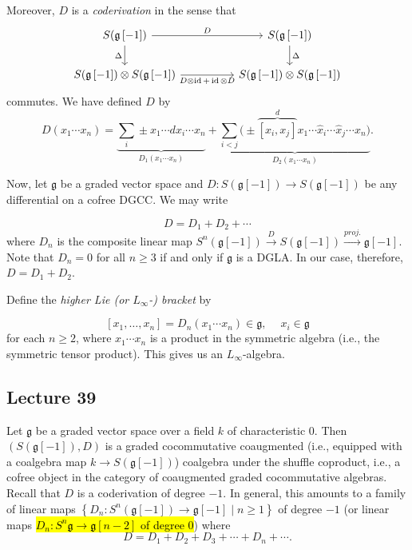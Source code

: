 \documentclass[10pt,letterpaper,cm]{nupset}
\theoremstyle{definition}
\theoremstyle{theorem}
\theoremstyle{remark}
\newcommand{\1}{\mathbb{1}}
\newcommand{\0}{\vec 0}
\DeclareMathOperator{\id}{id}
\begin{document}
Moreover, $D$ is  a \textit{coderivation} in the sense that
\[
\begin{tikzcd}[column sep= huge]
	S(\mathfrak{g}\left[{-1}\right]) & S(\mathfrak{g}\left[{-1}\right]) \\
	{S(\mathfrak{g}\left[{-1}\right])\otimes S(\mathfrak{g}\left[{-1}\right])} & {S(\mathfrak{g}\left[{-1}\right])\otimes S(\mathfrak{g}\left[{-1}\right])}
	\arrow["\Delta"', from=1-1, to=2-1]
	\arrow["\Delta", from=1-2, to=2-2]
	\arrow["D", from=1-1, to=1-2]
	\arrow["{D\otimes \id + \id \otimes D}"', from=2-1, to=2-2]
\end{tikzcd}
\] commutes. We have defined $D$ by
\[
D(x_1 \cdots x_n) = 
\underbrace{\sum_i \pm x_1 \cdots d{x_i} \cdots x_n}_{D_1(x_1 \cdots x_n)} + \underbrace{\sum_{i < j} \big(\pm \overbrace{\left[x_i, x_j\right]}^{d} x_1 \cdots \hat{x}_i \cdots \hat{x}_j \cdots x_n\big)}_{D_2(x_{1} \cdots x_{n})}
.\]

\medskip

Now, let $\mathfrak{g}$ be a graded vector space and  $D : S(\mathfrak{g}\left[{-1}\right]) \to S(\mathfrak{g}\left[{-1}\right])$ be any differential on a cofree DGCC. We may write

\[
D= D_1 + D_2 + \cdots
\]
where $D_n$ is the composite linear map $S^n(\mathfrak{g}\left[{-1}\right]) \xrightarrow{D} S(\mathfrak{g}\left[{-1}\right]) \xrightarrow{\textit{proj.}} \mathfrak{g}\left[{-1}\right]$. Note that $D_n = 0$ for all $n \geq 3$ if and only if $\mathfrak{g}$ is a DGLA. In our case, therefore, $D = D_1 + D_2$.

\medskip

 Define the \textit{higher Lie \emph{(or $L_{\infty}$-)} bracket} by

\[
\left[x_1, \ldots, x_n\right] = D_n(x_1 \cdots x_n) \in \mathfrak{g}, \ \quad x_i \in \mathfrak{g}
\]
for each $n \geq 2$, where $x_1\cdots x_n$ is a product in the symmetric algebra (i.e., the symmetric tensor product).  This gives us an $L_{\infty}$-algebra. 

\subsection{Lecture 39}

Let $\mathfrak{g}$ be a graded vector space over a field $k$ of characteristic $0$. Then $\left(S(\mathfrak{g}\left[{-1}\right]), D\right)$ is a graded cocommutative coaugmented (i.e., equipped with a coalgebra map $k \to S(\mathfrak{g}\left[{-1}\right])$) coalgebra under the shuffle coproduct, i.e., a cofree object in the category of coaugmented graded cocommutative algebras. Recall that $D$ is a coderivation of degree ${-1}$. In general, this amounts to a family of linear maps $\left\{D_n : S^n(\mathfrak{g}\left[{-1}\right]) \to \mathfrak{g}\left[{-1}\right] \mid n \geq 1\right\}$ of degree ${-1}$ (or linear maps \hl{$D_n : S^n{\mathfrak{g}} \to \mathfrak{g}\left[n-2\right]$ of degree $0$}) where
\[
D = D_1 + D_2 + D_3 + \cdots + D_n + \cdots
.\]
\end{document}
